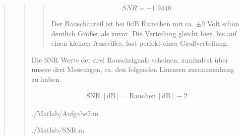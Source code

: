 \begin{quote}
\begin{quote}
\begin{quote}
            \begin{equation*}
            \begin{split}
                 SNR = -1.9448
            \end{split}
            \end{equation*}
            
            Der Rauschanteil ist bei 0dB Rauschen mit ca. $\pm9$ Volt schon deutlich Größer als zuvor. Die Verteilung gleicht
            hier, bis auf einen kleinen Ausreißer, fast perfekt einer Gaußverteilung.
            
        \end{quote}

            \vspace{4em}

        Die SNR Werte der drei Rauschsignale scheinen, zumindest über unsere drei Messungen, ca. den folgenden Linearen
        zusammenhang zu haben.
        
        \begin{equation*}
    	\begin{split}
    		\mathrm{SNR \ [dB]} = \mathrm{Rauchen \ [dB]} - 2 
    	\end{split}
        \end{equation*}
        
        \newpage
        
            {./Matlab/Aufgabe2.m}
        
        
            {./Matlab/SNR.m}
        
    \end{quote}
    
    
    
\end{quote}





%     
%         

% 
% 
% 



